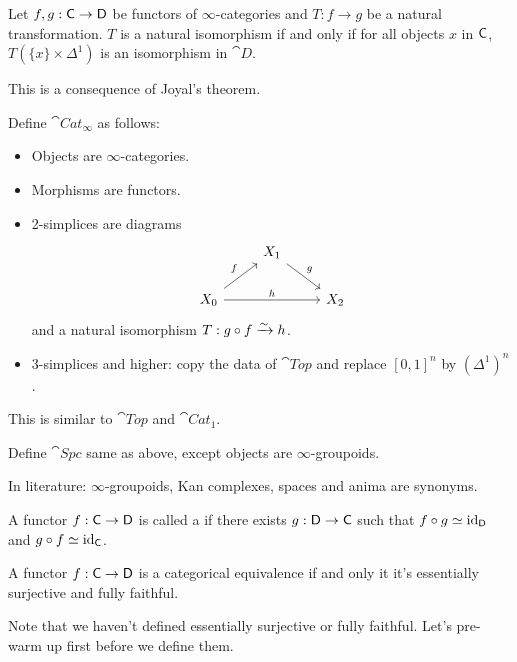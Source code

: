 \begin{theorem}
Let $f,g:\C\to \cat{D}$ be functors of $\infty$-categories and $T:f\to g$ be a natural
transformation. $T$ is a natural isomorphism if and only if for all objects $x$ in $\mathsf{C}$,
$T(\{x\}\times \Delta^{1})$ is an isomorphism in $\cat{D}$.
\end{theorem}
This is a consequence of Joyal's theorem.
\begin{definition}
Define $\cat{Cat}_\infty$ as follows:
\begin{itemize}
	\item Objects are $\infty$-categories.
	\item Morphisms are functors.
	\item 2-simplices are diagrams
		\[
			\begin{tikzcd}
				& X_1 \ar[dr,"g"] \\
				X_0 \ar[ur,"f"] \ar[rr,"h"] & & X_2
			\end{tikzcd}
		\]
		and a natural isomorphism $T:g\circ f\xrightarrow{\sim} h$.
	\item 3-simplices and higher: copy the data of $\cat{Top}$ and replace $[0,1]^{n}$ by
		$(\Delta^{1})^{n}$.
\end{itemize}
\end{definition}
This is similar to $\cat{Top}$ and $\cat{Cat}_1$.
\begin{definition}
Define $\cat{Spc}$ same as above, except objects are $\infty$-groupoids.
\end{definition}
In literature: $\infty$-groupoids, Kan complexes, spaces and anima are synonyms.
\begin{definition}
A functor $f:\C\to \cat{D}$ is called a  if there exists
$g:\cat{D}\to \C$ such that $f\circ g\simeq \operatorname{id}_{\mathsf{D}}$ and $g\circ f\simeq \operatorname{id}_{\mathsf{C}}$.
\end{definition}
\begin{theorem}
A functor $f:\C\to \cat{D}$ is a categorical equivalence if and only it it's essentially
surjective and fully faithful.
\end{theorem}
Note that we haven't defined essentially surjective or fully faithful. Let's pre-warm up
first before we define them.

